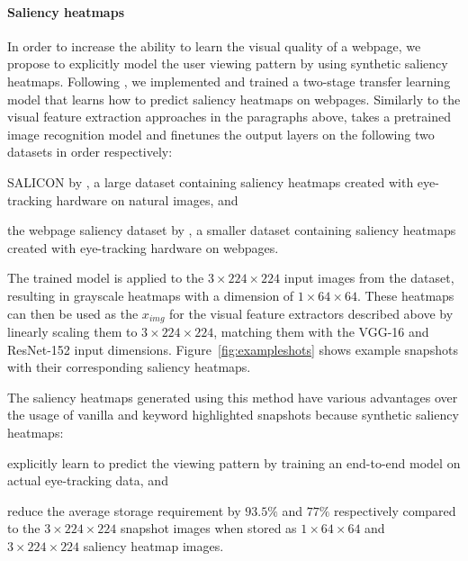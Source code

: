 \paragraph{Saliency heatmaps}
In order to increase the ability to learn the visual quality of a webpage, we propose to explicitly model the user viewing pattern by using synthetic saliency heatmaps. 
Following \cite{shan2017two}, we implemented and trained a two-stage transfer learning model that learns how to predict saliency heatmaps on webpages.
Similarly to the visual feature extraction approaches in the paragraphs above, \cite{shan2017two} takes a pretrained image recognition model and finetunes the output layers on the following two datasets in order respectively:
\begin{inparaenum}[(i)]
\item SALICON by \cite{jiang2015salicon}, a large dataset containing saliency heatmaps created with eye-tracking hardware on natural images, and 
\item the webpage saliency dataset by \cite{shen2014webpage}, a smaller dataset containing saliency heatmaps created with eye-tracking hardware on webpages.
\end{inparaenum}

The trained model is applied to the $3\times224\times224$ input images from the \datasetname data\-set, resulting in grayscale heatmaps with a dimension of $1\times64\times64$. These heatmaps can then be used as the $x_{img}$ for the visual feature extractors described above by linearly scaling them to $3\times224\times224$, matching them with the VGG-16 and ResNet-152 input dimensions. Figure~\ref{fig:exampleshots} shows example snapshots with their corresponding saliency heatmaps.

The saliency heatmaps generated using this method have various advantages over the usage of vanilla and keyword highlighted snapshots because synthetic saliency heatmaps:
\begin{inparaenum}[(i)]
\item explicitly learn to predict the viewing pattern by training an end-to-end model on actual eye-tracking data, and 
\item reduce the average storage requirement by $93.5\%$ and $77\%$ respectively compared to the $3\times224\times224$ snapshot images when stored as $1\times64\times64$ and $3\times224\times224$ saliency heatmap images.
\end{inparaenum}
